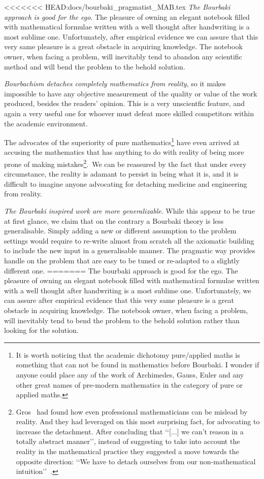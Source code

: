 \documentclass[]{scrartcl}
\theoremstyle{definition}
\begin{document}
<<<<<<< HEAD:docs/bourbaki_pragmatist_MAB.tex
\emph{The Bourbaki approach is good for the ego}. The pleasure of owning an elegant notebook filled with mathematical formulae written with a well thought after handwriting is a most sublime one. Unfortunately, after empirical evidence we can assure that this very same pleasure is a great obstacle in acquiring knowledge. The notebook owner, when facing a problem, will inevitably tend to abandon any scientific method and will bend the problem to the behold solution.

\emph{Bourbachism detaches completely mathematics from reality}, so it makes impossible to have any objective measurement of the quality or value of the work produced, besides the readers' opinion. This is a very unscientfic feature, and again a very useful one for whoever must defeat  more skilled competitors within the academic environment. 

The advocates of the superiority of pure mathematics\footnote{
    It is worth noticing that the academic dichotomy pure/applied maths is something that can not be found in mathematics before Bourbaki. I wonder if anyone could place any of the work of Archimedes, Gauss, Euler and any other great names of pre-modern mathematics in the category of pure or applied maths.
} have even arrived at accusing the mathematics that has anything to do with reality of being more prone of making mistakes\footnote{
    Gros~\cite{gros2019masters} had found how even professional mathematicians can be mislead by reality. And they had leveraged on this most surprising fact, for advocating to increase the detachment. After concluding that \lq\lq [...] we can't reason in a totally abstract manner\rq\rq, instead of suggesting to take into account the reality in the mathematical practice they suggested a move towards the opposite direction: \lq\lq We have to detach ourselves from our non-mathematical intuition\rq\rq~\cite{gros2019sciencedaily}.
}. We can be reassured by the fact that under every circumstance, the reality is adamant to persist in being what it is, and it is difficult to imagine anyone advocating for detaching medicine and engineering from reality.

\emph{The Bourbaki inspired work are more generalizable}. While this appear to be true at first glance, we claim that on the contrary a Bourbaki theory is less generalisable. Simply adding a new or different assumption to the problem settings would require to re-write almost from scratch all the axiomatic building to include the new input in a generalisable manner. The pragmatic way provides handle on the problem that are easy to be tuned or re-adapted to a slightly different one.
=======
The bourbaki approach is good for the ego. The pleasure of owning an elegant notebook filled with mathematical formulae written with a well thought after handwriting is a most sublime one. Unfortunately, we can assure after empirical evidence that this very same pleasure is a great obstacle in acquiring knowledge. The notebook owner, when facing a problem, will inevitably tend to bend the problem to the behold solution rather than looking for the solution.
\end{document}
